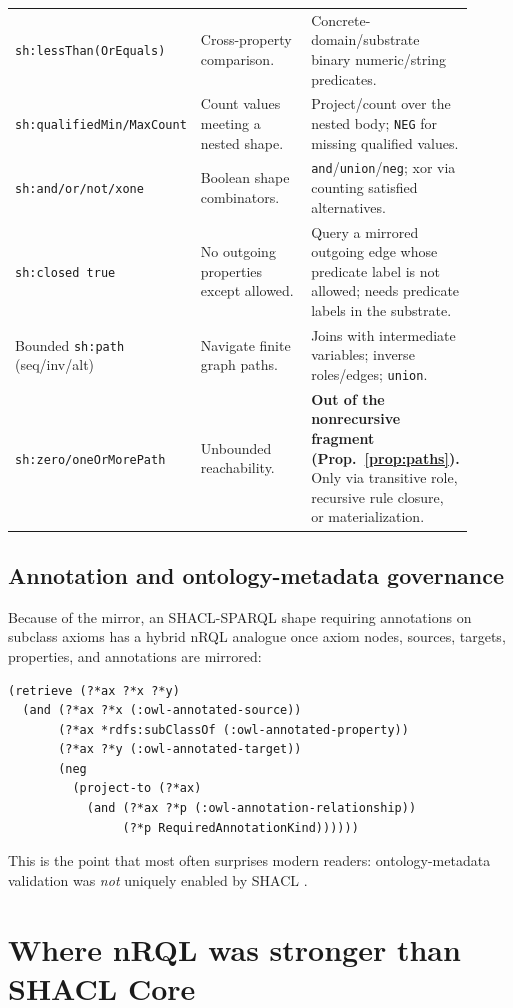 \documentclass[11pt,letterpaper]{article}
\theoremstyle{definition}
\newcommand{\nrql}{nRQL}
\newcommand{\shacl}{SHACL}
\begin{document}
\begin{longtable}{p{0.24\linewidth}p{0.33\linewidth}p{0.34\linewidth}}
\addlinespace
\texttt{sh:lessThan(OrEquals)} & Cross-property comparison. & Concrete-domain/substrate binary numeric/string predicates. \\
\addlinespace
\texttt{sh:qualifiedMin/MaxCount} & Count values meeting a nested shape. & Project/count over the nested body; \texttt{NEG} for missing qualified values. \\
\addlinespace
\texttt{sh:and/or/not/xone} & Boolean shape combinators. & \texttt{and}/\texttt{union}/\texttt{neg}; xor via counting satisfied alternatives. \\
\addlinespace
\texttt{sh:closed true} & No outgoing properties except allowed. & Query a mirrored outgoing edge whose predicate label is not allowed; needs predicate labels in the substrate. \\
\addlinespace
Bounded \texttt{sh:path} (seq/inv/alt) & Navigate finite graph paths. & Joins with intermediate variables; inverse roles/edges; \texttt{union}. \\
\addlinespace
\texttt{sh:zero/oneOrMorePath} & Unbounded reachability. & \textbf{Out of the nonrecursive fragment (Prop.~\ref{prop:paths}).} Only via transitive role, recursive rule closure, or materialization. \\
\bottomrule
\end{longtable}

\subsection{Annotation and ontology-metadata governance}
Because of the mirror, an \shacl{}-SPARQL shape requiring annotations on subclass axioms has a hybrid \nrql{} analogue once axiom nodes, sources, targets, properties, and annotations are mirrored:
\begin{lstlisting}[language=nrql,caption={Schematic nRQL version over a mirrored OWL substrate (marker names depend on the encoding).}]
(retrieve (?*ax ?*x ?*y)
  (and (?*ax ?*x (:owl-annotated-source))
       (?*ax *rdfs:subClassOf (:owl-annotated-property))
       (?*ax ?*y (:owl-annotated-target))
       (neg
         (project-to (?*ax)
           (and (?*ax ?*p (:owl-annotation-relationship))
                (?*p RequiredAnnotationKind))))))
\end{lstlisting}
This is the point that most often surprises modern readers: ontology-metadata validation was \emph{not} uniquely enabled by \shacl{} \cite[pp.~141--143]{racerug}.

\section{Where nRQL was stronger than SHACL Core}\label{sec:stronger}
\end{document}
